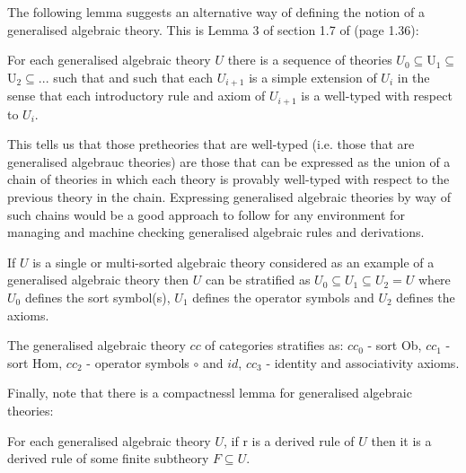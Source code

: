 The following lemma suggests an  alternative way of defining the notion of a generalised algebraic theory. 
This is Lemma 3 of section 1.7 of \cite{Cartmell78} (page 1.36):
\begin{lemma}
 For each generalised algebraic theory $U$  there is a sequence of theories 
$U_0 \subseteq $U$_1 \subseteq $U$_2 \subseteq ...$ such that  
and such that each $U_{i+1}$ is a simple extension of $U_i$ in the sense that each introductory rule and axiom of $U_{i+1}$ is a well-typed  with respect to $U_i$.
\end{lemma}
This tells us that those pretheories that are well-typed (i.e. those that are generalised algebrauc theories) are those that can be expressed as the union of a chain of theories in which each theory is provably well-typed with respect to the previous theory in the chain.  
Expressing generalised algebraic theories by way of such chains would be a good approach to follow
for any environment for managing and machine checking generalised algebraic  rules and derivations.

\begin{example}
If $U$ is a single or multi-sorted algebraic theory considered as an example of a
 generalised algebraic theory then $U$ can be stratified as $U_0 \subseteq U_1 \subseteq U_2=U$
where $U_0$ defines the sort symbol(s), $U_1$ defines the operator symbols and $U_2$ defines the axioms. 
\end{example}

\begin{example}
 The generalised algebraic theory $cc$ of categories stratifies as: $cc_0$ - sort Ob,
$cc_1$ - sort Hom, $cc_2$ - operator symbols $\circ$ and $id$, $cc_3$ - identity and associativity axioms.
\end{example} 

 Finally, note that there is a compactnessl lemma for generalised algebraic theories:
\begin{lemma}
For each generalised algebraic theory $U$, if r is a derived rule of $U$ then it is a derived rule of some finite subtheory $F \subseteq U$. \
\end{lemma}



